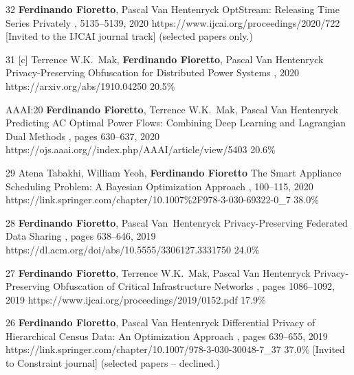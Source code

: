 \begin{pubs}
\confentryAwd
		{32} %
		{{\bf Ferdinando Fioretto}, Pascal Van Hentenryck}
		{OptStream: Releasing Time Series Privately}
		{\procIJCAI, 5135--5139, 2020}
	    {https://www.ijcai.org/proceedings/2020/722}
		{[Invited to the IJCAI journal track]}
		{(selected papers only.)}{}
	
	\confentry
		{31} %
		{[c] Terrence W.K.~Mak, {\bf Ferdinando Fioretto}, Pascal Van Hentenryck}
		{Privacy-Preserving Obfuscation for Distributed Power Systems}
		{\procPSCC, 2020}
		{https://arxiv.org/abs/1910.04250}
	    {20.5\%} %

\confentry
		{AAAI:20} %
		{{\bf Ferdinando Fioretto}, Terrence W.K.~Mak, Pascal Van Hentenryck}
		{Predicting AC Optimal Power Flows: Combining Deep Learning and Lagrangian Dual Methods}
	  	{\procAAAI, pages 630--637, 2020}
	  	{https://ojs.aaai.org//index.php/AAAI/article/view/5403}
	    {20.6\%} %

	\confentry
		{29} %
	    {Atena Tabakhi, William Yeoh, {\bf Ferdinando Fioretto}}
	    {The Smart Appliance Scheduling Problem: A Bayesian Optimization Approach}
	    {\procPRIMA, 100--115, 2020}
	    {https://link.springer.com/chapter/10.1007\%2F978-3-030-69322-0\_7}
	    {38.0\%} %

	\confentry
		{28} %
		{{\bf Ferdinando Fioretto}, Pascal Van~Hentenryck}
		{Privacy-Preserving Federated Data Sharing}
	  	{\procAAMAS, pages 638--646, 2019}
	  	{https://dl.acm.org/doi/abs/10.5555/3306127.3331750}
		{24.0\%} %

	\confentry
		{27} %
		{{\bf Ferdinando Fioretto}, Terrence W.K.~Mak, Pascal Van Hentenryck}
		{Privacy-Preserving Obfuscation of Critical Infrastructure Networks}
	  	{\procIJCAI, pages 1086--1092, 2019}
	  	{https://www.ijcai.org/proceedings/2019/0152.pdf}
	    {17.9\%} %

	\confentryAwd
		{26} %
		{{\bf Ferdinando Fioretto}, Pascal Van Hentenryck}
		{Differential Privacy of Hierarchical Census Data: An Optimization Approach} 
		{\procCP, pages 639--655, 2019}
		{https://link.springer.com/chapter/10.1007/978-3-030-30048-7\_37}
		{37.0\%}
		{[Invited to Constraint journal]}
		{(selected papers -- declined.)}


\end{pubs}
